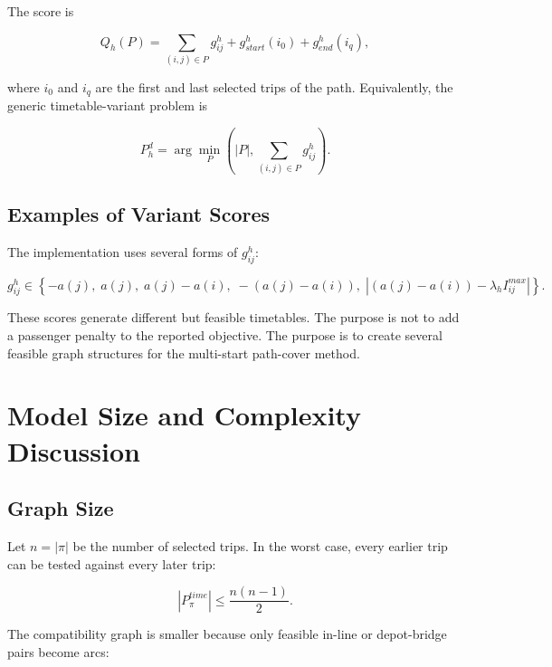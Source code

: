 The score is

\begin{equation}
Q_h(P)
=
\sum_{(i,j)\in P}g^h_{ij}
+g^h_{start}(i_0)
+g^h_{end}(i_q),
\label{eq:timetable-follow-score}
\end{equation}

where \(i_0\) and \(i_q\) are the first and last selected trips of the path.
Equivalently, the generic timetable-variant problem is

\begin{equation}
P_h^d
=
\arg\min_P
\left(
|P|,
\sum_{(i,j)\in P}g^h_{ij}
\right).
\label{eq:timetable-variant}
\end{equation}

\subsection{Examples of Variant Scores}

The implementation uses several forms of \(g^h_{ij}\):

\begin{equation}
g^h_{ij}\in
\left\{
-a(j),\;
a(j),\;
a(j)-a(i),\;
-(a(j)-a(i)),\;
\left|(a(j)-a(i))-\lambda_h I^{max}_{ij}\right|
\right\}.
\label{eq:timetable-score-examples}
\end{equation}

These scores generate different but feasible timetables. The purpose is not to
add a passenger penalty to the reported objective. The purpose is to create
several feasible graph structures for the multi-start path-cover method.

\section{Model Size and Complexity Discussion}

\subsection{Graph Size}

Let \(n=|\pi|\) be the number of selected trips. In the worst case, every
earlier trip can be tested against every later trip:

\begin{equation}
|P^{time}_\pi|
\le
\frac{n(n-1)}{2}.
\label{eq:time-pair-bound}
\end{equation}

The compatibility graph is smaller because only feasible in-line or
depot-bridge pairs become arcs:

